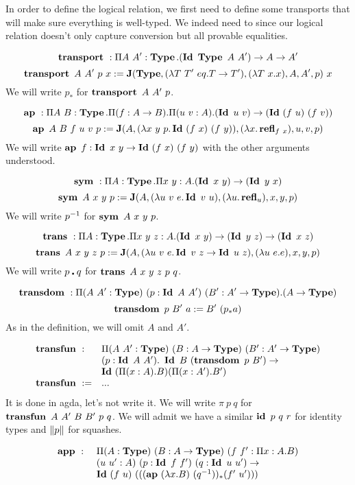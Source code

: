 \documentclass[a4paper,english]{lipics-utf8x}
\begin{document}

  In order to define the logical relation, we first need to define some
  transports that will make sure everything is well-typed. We indeed need to
  since our logical relation doesn't only capture conversion but all provable
  equalities.

  \[\operatorname{\mathbf{transport}~} : \Pi A\ A' : \operatorname{\mathbf{Type}}.(\operatorname{\mathbf{Id}~} \operatorname{\mathbf{Type}}\ A\ A') \to A \to A'\]
  \[\transport A\ A'\ p\ x := \J(\Type, (\lambda T\ T'\ eq. T \to T'),
  (\lambda T\ x. x), A, A', p)\ x\]
  We will write $p_*$ for $\operatorname{\mathbf{transport}~} A\ A'\ p$.

  \[\operatorname{\mathbf{ap}~} : \Pi A\ B : \operatorname{\mathbf{Type}}. \Pi (f : A \to B). \Pi (u\ v : A).
    (\operatorname{\mathbf{Id}~} u\ v) \to (\operatorname{\mathbf{Id}~} (f\ u)\ (f\ v))\]
  \[\operatorname{\mathbf{ap}~} A\ B\ f\ u\ v\ p := \operatorname{\mathbf{J}}(A, (\lambda x\ y\ p. \operatorname{\mathbf{Id}~} (f\ x)\ (f\ y)),
  (\lambda x. \operatorname{\mathbf{refl}}_{f\ x}), u, v, p)\]
  We will write $\operatorname{\mathbf{ap}~} f : \operatorname{\mathbf{Id}~} x\ y \to \operatorname{\mathbf{Id}~} (f\ x)\ (f\ y)$ with the other
  arguments understood.

  \[\operatorname{\mathbf{sym}~} : \Pi A : \operatorname{\mathbf{Type}}. \Pi x\ y : A. (\operatorname{\mathbf{Id}~} x\ y) \to (\operatorname{\mathbf{Id}~} y\ x)\]
  \[\sym A\ x\ y\ p := \J(A, (\lambda u\ v\ e. \Id v\ u), (\lambda u. \refl_u),
  x,y,p)\]
  We will write $p^{-1}$ for $\operatorname{\mathbf{sym}~} A\ x\ y\ p$.

  \[\operatorname{\mathbf{trans}~} : \Pi A : \operatorname{\mathbf{Type}}. \Pi x\ y\ z : A.
  (\operatorname{\mathbf{Id}~} x\ y) \to (\operatorname{\mathbf{Id}~} y\ z) \to (\operatorname{\mathbf{Id}~} x\ z)\]
  \[
    \operatorname{\mathbf{trans}~} A\ x\ y\ z\ p := \operatorname{\mathbf{J}}(A, (\lambda u\ v\ e. \operatorname{\mathbf{Id}~} v\ z \to \operatorname{\mathbf{Id}~} u\ z),
    (\lambda u\ e. e), x, y, p)
  \]
  We will write $p \centerdot q$ for $\operatorname{\mathbf{trans}~} A\ x\ y\ z\ p\ q$.

  \[
    \operatorname{\mathbf{transdom}~} : \Pi (A\ A' : \operatorname{\mathbf{Type}})\ (p : \operatorname{\mathbf{Id}~} A\ A')\ (B' : A' \to \operatorname{\mathbf{Type}}).
                (A \to \operatorname{\mathbf{Type}})
  \]
  \[
    \operatorname{\mathbf{transdom}~} p\ B'\ a := B'\ (p_* a)
  \]
  As in the definition, we will omit $A$ and $A'$.

  \[
  \begin{array}{l@{\quad}l}
    \transfun :~& \Pi (A\ A' : \Type)\ (B : A \to \Type)\ (B' : A' \to \Type) \\
                & (p : \Id A\ A').\ \Id B\ (\transdom p\ B') \to \\
                & \Id (\Pi (x:A).B) (\Pi (x:A').B') \\
    \transfun :=& ...
  \end{array}
  \]
  It is done in agda, let's not write it.
  We will write $\pi\ p\ q$ for $\operatorname{\mathbf{transfun}~} A\ A'\ B\ B'\ p\ q$.
  We will admit we have a similar $\id\ p\ q\ r$ for identity types and
  $\|p\|$ for squashes.

  \[
  \begin{array}{l@{\quad}l}
    \app :~& \Pi (A : \Type)\ (B : A \to \Type)\ (f\ f' : \Pi x:A.B) \\
           & (u\ u' : A)\ (p : \Id f\ f')\ (q : \Id u\ u') \to \\
           & \Id (f\ u)\ (((\ap (\lambda x.B)\ (q\inv))_* (f'\ u')))
  \end{array}
  \]
\end{document}
